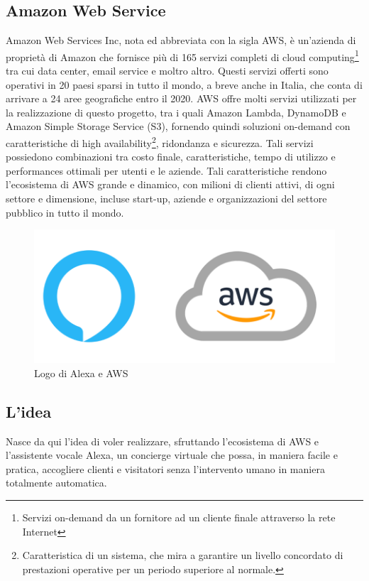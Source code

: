 \subsection{Amazon Web Service}
Amazon Web Services Inc, nota ed abbreviata con la sigla AWS, è un'azienda di proprietà di Amazon che fornisce più di 165 servizi completi di cloud computing\footnote{Servizi on-demand da un fornitore ad un cliente finale attraverso la rete Internet} tra cui data center, email service e moltro altro. Questi servizi offerti sono operativi in 20 paesi sparsi in tutto il mondo, a breve anche in Italia, che conta di arrivare a 24 aree geografiche entro il 2020. AWS offre molti servizi utilizzati per la realizzazione di questo progetto, tra i quali Amazon Lambda, DynamoDB e Amazon Simple Storage Service (S3), fornendo quindi soluzioni on-demand con caratteristiche di high availability\footnote{Caratteristica di un sistema, che mira a garantire un livello concordato di prestazioni operative per un periodo superiore al normale.}, ridondanza e sicurezza. Tali servizi possiedono combinazioni tra costo finale, caratteristiche, tempo di utilizzo e performances ottimali per utenti e le aziende. Tali caratteristiche rendono l'ecosistema di AWS grande e dinamico, con milioni di clienti attivi, di ogni settore e dimensione, incluse start-up, aziende e organizzazioni del settore pubblico in tutto il mondo.
\begin{figure}[H] 
    \centering 
    \includegraphics[width=0.8\columnwidth]{immagini/alexa_awspng.png}
    \caption{\label{fig:alexa_aws}Logo di Alexa e AWS}
\end{figure}

\subsection{L'idea}
Nasce da qui l'idea di voler realizzare, sfruttando l'ecosistema di AWS e l'assistente vocale Alexa, un concierge virtuale che possa, in maniera facile e pratica, accogliere clienti e visitatori senza l'intervento umano in maniera totalmente automatica.


